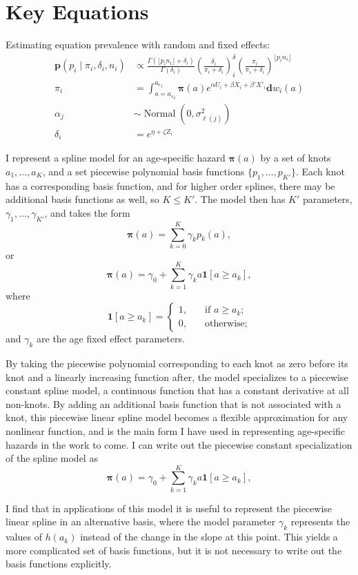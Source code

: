 \documentclass[12pt]{article}
\newcommand{\1}{\mathbf{1}}
\newcommand{\0}{\mathbf{0}}
\newcommand{\given}{\;|\;}
\newcommand{\dens}{\mathbf{p}}
\renewcommand{\d}{\mathbf{d}}
\newcommand{\Normal}{\operatorname{Normal}}
\def\boldpi{{\boldsymbol{\pi}}}
\begin{document}
\section{Key Equations}

Estimating equation prevalence with random and fixed effects:
\begin{align*}
\dens(p_i\given \pi_i, \delta_i, n_i) &\propto
 \frac{\Gamma(\lfloor p_in_i \rfloor+\delta_i)}{\Gamma(\delta_i)}
 \left(\frac{\delta_i}{\pi_i+\delta_i}\right)^\delta_i \left(\frac{\pi_i}{\pi_i+\delta_i}\right)^{\lfloor p_in_i\rfloor}\\
\pi_i &= \int_{a={a_s}_i}^{{a_e}_i} \boldpi(a) e^{\alpha U_i + \beta X_i + \beta' X'_i} \d w_i(a)\\
\alpha_j &\sim \Normal\left(0, \sigma_{\ell(j)}^2\right)\\
\delta_i &= e^{\eta + \zeta Z_i}
\end{align*}


I represent a spline model for an age-specific hazard $\boldpi(a)$ by a set
of knots $a_1,\dots,a_{K}$, and a set piecewise polynomial basis
functions $\{p_1,\ldots,p_{K'}\}$.  Each knot has a corresponding
basis function, and for higher order splines, there may be additional
basis functions as well, so $K \leq K'$.  The model then has $K'$
parameters, $\gamma_1,\ldots,\gamma_{K'}$, and takes the form
\[
\boldpi(a) = \sum_{k=0}^{K} \gamma_k p_k(a),
\]
or
\[
\boldpi(a) = \gamma_0 + \sum_{k=1}^K \gamma_k a \1[a \geq a_k],
\]
where
\[
\1[a \geq a_k]
=
\begin{cases}
1,&\quad\text{if } a \geq a_k;\\
0,&\quad\text{otherwise;}
\end{cases}
\]
and $\gamma_k$ are the age fixed effect parameters.



By taking the piecewise polynomial corresponding to each knot as zero
before its knot and a linearly increasing function after, the model
specializes to a piecewise constant spline model, a continuous
function that has a constant derivative at all non-knots.  By adding
an additional basis function that is not associated with a knot, this
piecewise linear spline model becomes a flexible approximation for any
nonlinear function, and is the main form I have used in representing
age-specific hazards in the work to come.  I can write out the
piecewise constant specialization of the spline model as
\[
\boldpi(a) = \gamma_0 + \sum_{k=1}^K \gamma_k a \1[a \geq a_k],
\]

I find that in applications of this model it is useful to represent
the piecewise linear spline in an alternative basis, where the model
parameter $\gamma_k$ represents the values of $h(a_k)$ instead of the
change in the slope at this point.  This yields a more complicated set
of basis functions, but it is not necessary to write out the basis
functions explicitly.
\end{document}
